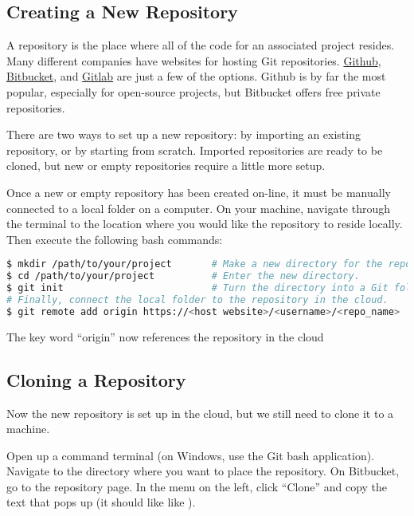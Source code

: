 \subsection*{Creating a New Repository} %

A repository is the place where all of the code for an associated project resides.
Many different companies have websites for hosting Git repositories.
\href{https://github.com/}{Github}, \href{https://bitbucket.org/}{Bitbucket}, and \href{https://gitlab.com/}{Gitlab} are just a few of the options.
Github is by far the most popular, especially for open-source projects, but Bitbucket offers free private repositories.

There are two ways to set up a new repository: by importing an existing repository, or by starting from scratch.
Imported repositories are ready to be cloned, but new or empty repositories require a little more setup.

Once a new or empty repository has been created on-line, it must be manually connected to a local folder on a computer.
On your machine, navigate through the terminal to the location where you would like the repository to reside locally.
Then execute the following bash commands:

\begin{lstlisting}[language=bash]
$ mkdir /path/to/your/project       # Make a new directory for the repository.
$ cd /path/to/your/project          # Enter the new directory.
$ git init                          # Turn the directory into a Git folder.
# Finally, connect the local folder to the repository in the cloud.
$ git remote add origin https://<host website>/<username>/<repo_name>
\end{lstlisting}

The key word ``origin'' now references the repository in the cloud

\subsection*{Cloning a Repository} %

Now the new repository is set up in the cloud, but we still need to clone it to a machine.

Open up a command terminal (on Windows, use the Git bash application).
Navigate to the directory where you want to place the repository.
On Bitbucket, go to the repository page.
In the menu on the left, click ``Clone'' and copy the text that pops up (it should like like ).

